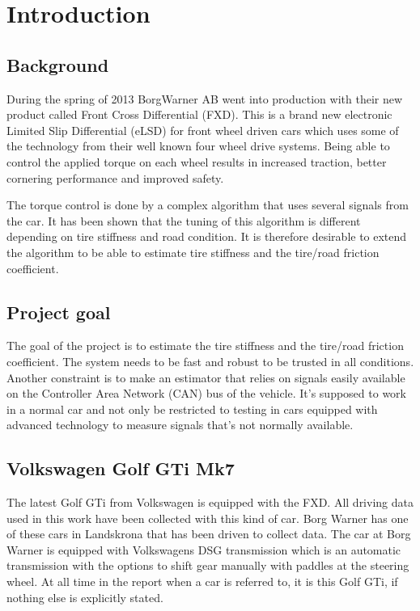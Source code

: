 \chapter{Introduction}

\section{Background}
During the spring of 2013 BorgWarner AB went into production with their new product called Front Cross Differential (FXD). This is a brand new electronic Limited Slip Differential (eLSD) for front wheel driven cars which uses some of the technology from their well known four wheel drive systems. Being able to control the applied torque on each wheel results in increased traction, better cornering performance and improved safety.

The torque control is done by a complex algorithm that uses several signals from the car. It has been shown that the tuning of this algorithm is different depending on tire stiffness and road condition. It is therefore desirable to extend the algorithm to be able to estimate tire stiffness and the tire/road friction coefficient.

\section{Project goal}
The goal of the project is to estimate the tire stiffness and the tire/road friction coefficient. The system needs to be fast and robust to be trusted in all conditions. Another constraint is to make an estimator that relies on signals easily available on the Controller Area Network (CAN) bus of the vehicle. It's supposed to work in a normal car and not only be restricted to testing in cars equipped with advanced technology to measure signals that's not normally available. 

\section{Volkswagen Golf GTi Mk7}
The latest Golf GTi from Volkswagen is equipped with the FXD. All driving data used in this work have been collected with this kind of car. Borg Warner has one of these cars in Landskrona that has been driven to collect data. The car at Borg Warner is equipped with Volkswagens DSG transmission which is an automatic transmission with the options to shift gear manually with paddles at the steering wheel. At all time in the report when a car is referred to, it is this Golf GTi, if nothing else is explicitly stated.

